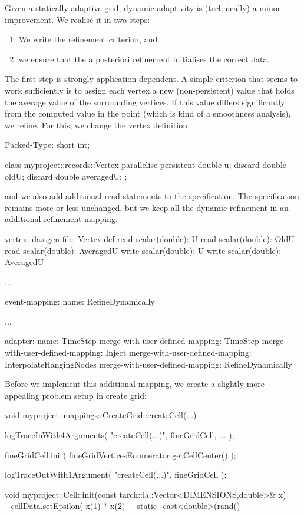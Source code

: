 Given a statically adaptive grid, dynamic adaptivity is (technically) a minor
improvement. 
We realise it in two steps:
\begin{enumerate}
  \item We write the refinement criterion, and 
  \item we ensure that the a posteriori refinement initialises the correct data.
\end{enumerate}

The first step is strongly application dependent. 
A simple criterion that seems to work sufficiently is to assign each vertex a
new (non-persistent) value that holds the average value of the surrounding
vertices. 
If this value differs significantly from the computed value in the point (which
is kind of a smoothness analysis), we refine.
For this, we change the vertex definition
\begin{code}
Packed-Type: short int;


class myproject::records::Vertex {  
  parallelise persistent double  u;
  discard    double  oldU;
  discard    double  averagedU;
};
\end{code}

\noindent
and we also add additional read statements to the specification.
The specification remains more or less unchanged, but we keep all the dynamic
refinement in an additional refinement mapping.

\begin{code}
vertex:
  dastgen-file: Vertex.def
  read scalar(double): U
  read scalar(double): OldU
  read scalar(double): AveragedU
  write scalar(double): U
  write scalar(double): AveragedU
  
...

event-mapping:
  name: RefineDynamically

...

adapter:
  name: TimeStep
  merge-with-user-defined-mapping: TimeStep
  merge-with-user-defined-mapping: Inject
  merge-with-user-defined-mapping: InterpolateHangingNodes
  merge-with-user-defined-mapping: RefineDynamically
\end{code}

\noindent
Before we implement this additional mapping, we create a slightly more appealing
problem setup in create grid:
\begin{code}
void myproject::mappings::CreateGrid::createCell(...) {
  logTraceInWith4Arguments( "createCell(...)", fineGridCell, ... );

  fineGridCell.init( fineGridVerticesEnumerator.getCellCenter() );

  logTraceOutWith1Argument( "createCell(...)", fineGridCell );
}


void myproject::Cell::init(const tarch::la::Vector<DIMENSIONS,double>&  x) {
  _cellData.setEpsilon( x(1) * x(2) + static_cast<double>(rand() %
}
\end{code}

